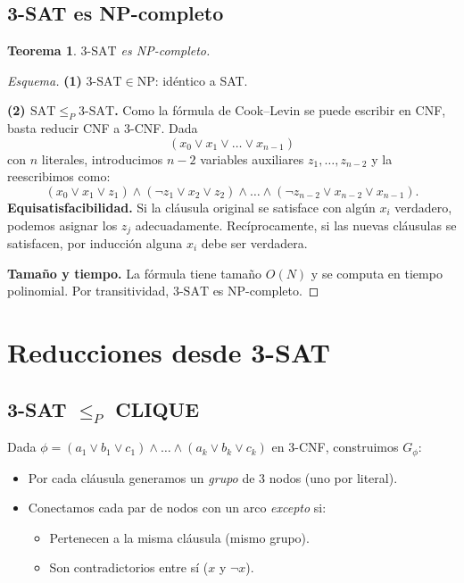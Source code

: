 \documentclass[11pt,a4paper]{article}
\theoremstyle{definicion}
\newtheorem{teorema}[definicion]{Teorema}
\newcommand{\redP}{\leq_{P}}
\newcommand{\NP}{\mathrm{NP}}
\begin{document}
\subsection{3-SAT es NP-completo}

\begin{teorema}
$\mathrm{3\text{-}SAT}$ es NP-completo.
\end{teorema}

\begin{proof}[Esquema]
\textbf{(1)} $\mathrm{3\text{-}SAT} \in \NP$: id\'entico a SAT.

\textbf{(2) $\mathrm{SAT} \redP \mathrm{3\text{-}SAT}$.} Como la f\'ormula de Cook--Levin se puede escribir en CNF, basta reducir CNF a 3-CNF. Dada
\[
(x_0 \lor x_1 \lor \dots \lor x_{n-1})
\]
con $n$ literales, introducimos $n - 2$ variables auxiliares $z_1, \dots, z_{n-2}$ y la reescribimos como:
\[
(x_0 \lor x_1 \lor z_1) \land (\neg z_1 \lor x_2 \lor z_2) \land \dots \land (\neg z_{n-2} \lor x_{n-2} \lor x_{n-1}).
\]
\textbf{Equisatisfacibilidad.} Si la cl\'ausula original se satisface con alg\'un $x_i$ verdadero, podemos asignar los $z_j$ adecuadamente. Rec\'iprocamente, si las nuevas cl\'ausulas se satisfacen, por inducci\'on alguna $x_i$ debe ser verdadera.

\textbf{Tama\~no y tiempo.} La f\'ormula tiene tama\~no $O(N)$ y se computa en tiempo polinomial. Por transitividad, $\mathrm{3\text{-}SAT}$ es NP-completo.
\end{proof}

\section{Reducciones desde 3-SAT}

\subsection{3-SAT $\redP$ CLIQUE}

Dada $\phi = (a_1 \lor b_1 \lor c_1) \land \dots \land (a_k \lor b_k \lor c_k)$ en 3-CNF, construimos $G_\phi$:
\begin{itemize}
    \item Por cada cl\'ausula generamos un \emph{grupo} de 3 nodos (uno por literal).
    \item Conectamos cada par de nodos con un arco \emph{excepto} si:
    \begin{itemize}
        \item Pertenecen a la misma cl\'ausula (mismo grupo).
        \item Son contradictorios entre s\'i ($x$ y $\neg x$).
    \end{itemize}
\end{itemize}
\end{document}
